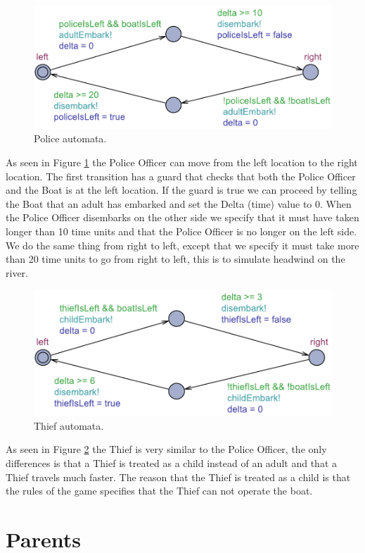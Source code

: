 \documentclass[a4paper,12pt]{scrartcl}
\begin{document}
\begin{figure}[h!]
\centering
\includegraphics[width=0.7\linewidth]{Police.pdf}
\caption{Police automata.}
\label{fig:police}
\end{figure}

As seen in Figure \ref{fig:police} the Police Officer can move from the left location to the right location. The first transition has a guard that checks that both the Police Officer and the Boat is at the left location. If the guard is true we can proceed by telling the Boat that an adult has embarked and set the Delta (time) value to 0. When the Police Officer disembarks on the other side we specify that it must have taken longer than 10 time units and that the Police Officer is no longer on the left side.
We do the same thing from right to left, except that we specify it must take more than 20 time units to go from right to left, this is to simulate headwind on the river.

\begin{figure}[h!]
\centering
\includegraphics[width=0.7\linewidth]{Thief.pdf}
\caption{Thief automata.}
\label{fig:thief}
\end{figure}

As seen in Figure \ref{fig:thief} the Thief is very similar to the Police Officer, the only differences is that a Thief is treated as a child instead of an adult and that a Thief travels much faster. The reason that the Thief is treated as a child is that the rules of the game specifies that the Thief can not operate the boat.

\section*{Parents}
\end{document}
